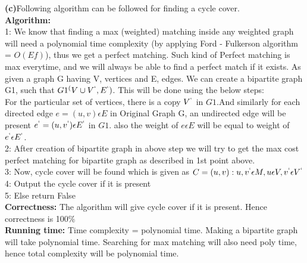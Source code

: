 \documentclass[11pt]{article}
\renewcommand\part[1]{\vspace{.10in}\textbf{(#1)}}
\newcommand\algorithm{\vspace{.10in}\textbf{Algorithm: }}
\newcommand\correctness{\vspace{.10in}\textbf{Correctness: }}
\newcommand\runtime{\vspace{.10in}\textbf{Running time: }}
\begin{document}
\part{c}Following algorithm can be followed for finding a cycle cover.\\
\algorithm 
\\1: We know that finding a max (weighted) matching inside any weighted graph will need a polynomial time complexity (by applying Ford - Fulkerson algorithm = $O(Ef)$), thus we get a perfect matching. Such kind of Perfect matching is max everytime, and we will always be able to find a perfect match if it exists. As given a graph G having V, vertices and E, edges. We can create a bipartite graph G1, such that $G1^(V \cup V^`,E^`)$. This will be done using the below steps:\\
For the particular set of vertices, there is a copy $V^`$ in $G1$.And similarly for each directed edge $e=(u,v) \epsilon E $ in Original Graph G, an undirected edge will be present $e^` = (u,v^`) \epsilon E^`$ in $G1$. also the weight of  $e \epsilon E$ will be equal to weight of $e^` \epsilon E^`$.\\
2: After creation of bipartite graph in above step we will try to get the max cost perfect matching for bipartite graph as described in 1st point above.\\
3: Now, cycle cover will be found which is given as $C = {(u,v):{u,v^`} \epsilon M,u \epsilon V, v^` \epsilon V^`}$\\
4: Output the cycle cover if it is present\\
5: Else return False\\
\correctness The algorithm will give cycle cover if it is present. Hence correctness is 100$\%$\\
\runtime Time complexity = polynomial time. Making a bipartite graph will take polynomial time. Searching for max matching will also need poly time, hence total complexity will be polynomial time.\\  
\end{document}
